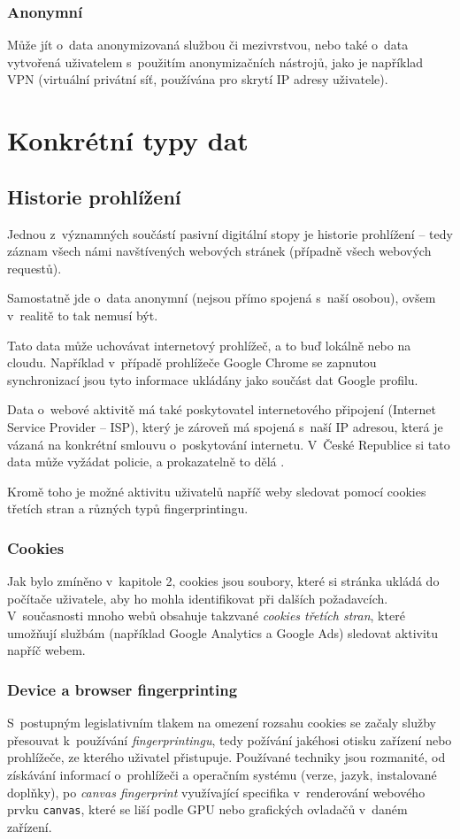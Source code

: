 \subsubsection*{Anonymní}

Může jít o~data anonymizovaná službou či mezivrstvou, nebo také o~data vytvořená uživatelem s~použitím anonymizačních nástrojů, jako je například VPN (virtuální privátní síť, používána pro skrytí IP adresy uživatele).

\section{Konkrétní typy dat}

\subsection{Historie prohlížení}
Jednou z~významných součástí pasivní digitální stopy je historie prohlížení -- tedy záznam všech námi navštívených webových stránek (případně všech webových requestů).


Samostatně jde o~data anonymní (nejsou přímo spojená s~naší osobou), ovšem v~realitě to tak nemusí být.

Tato data může uchovávat internetový prohlížeč, a to buď lokálně nebo na cloudu. Například v~případě prohlížeče Google Chrome se zapnutou synchronizací jsou tyto informace ukládány jako součást dat Google profilu.

Data o~webové aktivitě má také poskytovatel internetového připojení (Internet Service Provider -- ISP), který je zároveň má spojená s~naší IP adresou, která je vázaná na konkrétní smlouvu o~poskytování internetu. V~České Republice si tato data může vyžádat policie, a prokazatelně to dělá \citep{policie-isp}.

Kromě toho je možné aktivitu uživatelů napříč weby sledovat pomocí cookies třetích stran a různých typů fingerprintingu.
\subsubsection*{Cookies}
Jak bylo zmíněno v~kapitole 2, cookies jsou soubory, které si stránka ukládá do počítače uživatele, aby ho mohla identifikovat při dalších požadavcích. V~současnosti mnoho webů obsahuje takzvané \textit{cookies třetích stran}, které umožňují službám (například Google Analytics a Google Ads) sledovat aktivitu napříč webem.

\subsubsection*{Device a browser fingerprinting}
S~postupným legislativním tlakem na omezení rozsahu cookies se začaly služby přesouvat k~používání \textit{fingerprintingu}, tedy požívání jakéhosi otisku zařízení nebo prohlížeče, ze kterého uživatel přistupuje. Používané techniky jsou rozmanité, od získávání informací o~prohlížeči a operačním systému (verze, jazyk, instalované doplňky), po \textit{canvas fingerprint} využívající specifika v~renderování webového prvku \verb|canvas|, které se liší podle GPU nebo grafických ovladačů v~daném zařízení.  

